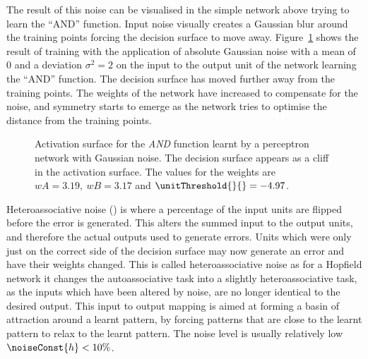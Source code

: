 The result of this noise can be visualised in the simple network above trying to learn the ``AND'' function.  Input noise visually creates a Gaussian blur around the training points forcing the decision surface to move away. Figure~\ref{fig:noisePerceptron} shows the result of training with the application of absolute Gaussian noise with a mean of $0$ and a deviation $\sigma^{2}=2$ on the input to the output unit of the network learning the ``AND'' function.  The decision surface has moved further away from the training points.  The weights of the network have increased to compensate for the noise, and symmetry starts to emerge as the network tries to optimise the distance from the training points.

\begin{figure}[ht]
  \begin{center}
        
        \caption{Activation surface for the \emph{AND} function learnt by a perceptron network with Gaussian noise.  The decision surface appears as a cliff in the activation surface. The values for the weights are $wA=3.19,\ wB=3.17$ and $ \unitThreshold{}{}=-4.97$.}
        \label{fig:noisePerceptron}
  \end{center}
\end{figure}

Heteroassociative noise () is where a percentage of the input units are flipped before the error is generated. This alters the summed input to the output units, and therefore the actual outputs used to generate errors.  Units which were only just on the correct side of the decision surface may now generate an error and have their weights changed. This is called heteroassociative noise as for a Hopfield network it changes the autoassociative task into a slightly heteroassociative task, as the inputs which have been altered by noise, are no longer identical to the desired output.  This input to output mapping is aimed at forming a basin of attraction around a learnt pattern, by forcing patterns that are close to the learnt pattern to relax to the learnt pattern.  The noise level is usually relatively low $\noiseConst{h} <10\%$.  

